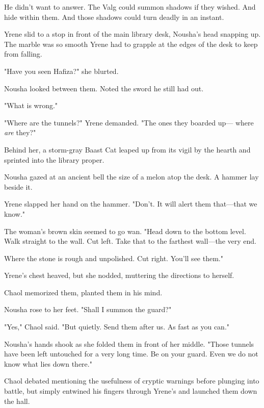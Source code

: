 He didn't want to answer.
The Valg could summon shadows if they wished.
And hide within them.
And those shadows could turn deadly in an instant.

Yrene slid to a stop in front of the main library desk, Nousha's head snapping up.
The marble was so smooth Yrene had to grapple at the edges of the desk to keep from falling.

"Have you seen Hafiza?"
she blurted.

Nousha looked between them.
Noted the sword he still had out.

"What is wrong."

"Where are the tunnels?"
Yrene demanded.
"The ones they boarded up--- where \emph{are} they?"

Behind her, a storm-gray Baast Cat leaped up from its vigil by the hearth and sprinted into the library proper.

Nousha gazed at an ancient bell the size of a melon atop the desk.
A hammer lay beside it.

Yrene slapped her hand on the hammer.
"Don't.
It will alert them that---that we know."

The woman's brown skin seemed to go wan.
"Head down to the bottom level.
Walk straight to the wall.
Cut left.
Take that to the farthest wall---the very end.

Where the stone is rough and unpolished.
Cut right.
You'll see them."

Yrene's chest heaved, but she nodded, muttering the directions to herself.

Chaol memorized them, planted them in his mind.

Nousha rose to her feet.
"Shall I summon the guard?"

"Yes," Chaol said.
"But quietly.
Send them after us.
As fast as you can."

Nousha's hands shook as she folded them in front of her middle.
"Those tunnels have been left untouched for a very long time.
Be on your guard.
Even we do not know what lies down there."

Chaol debated mentioning the usefulness of cryptic warnings before plunging into battle, but simply entwined his fingers through Yrene's and launched them down the hall.

